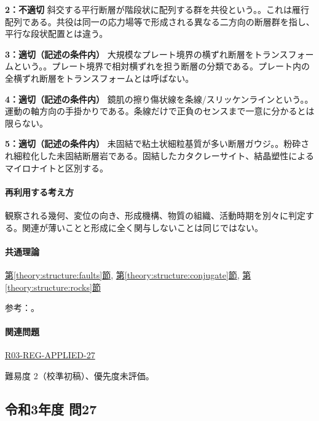 \noindent\textbf{2：不適切} 斜交する平行断層が階段状に配列する群を共役という。。これは雁行配列である。共役は同一の応力場等で形成される異なる二方向の断層群を指し、平行な段状配置とは違う。\par

\noindent\textbf{3：適切（記述の条件内）} 大規模なプレート境界の横ずれ断層をトランスフォームという。。プレート境界で相対横ずれを担う断層の分類である。プレート内の全横ずれ断層をトランスフォームとは呼ばない。\par

\noindent\textbf{4：適切（記述の条件内）} 鏡肌の擦り傷状線を条線/スリッケンラインという。。運動の軸方向の手掛かりである。条線だけで正負のセンスまで一意に分かるとは限らない。\par

\noindent\textbf{5：適切（記述の条件内）} 未固結で粘土状細粒基質が多い断層ガウジ。。粉砕され細粒化した未固結断層岩である。固結したカタクレーサイト、結晶塑性によるマイロナイトと区別する。\par

\paragraph{再利用する考え方} 観察される幾何、変位の向き、形成機構、物質の組織、活動時期を別々に判定する。関連が薄いことと形成に全く関与しないことは同じではない。

\paragraph{共通理論} \hyperref[theory:structure:faults]{第\ref*{theory:structure:faults}節}, \hyperref[theory:structure:conjugate]{第\ref*{theory:structure:conjugate}節}, \hyperref[theory:structure:rocks]{第\ref*{theory:structure:rocks}節}

\par 参考：\cite{str_faultrocks,str_shear}。

\paragraph{関連問題} \hyperref[q:r03-reg-applied-27]{R03-REG-APPLIED-27}

\par 難易度 2（校準初稿）、優先度未評価。

\subsection{令和3年度 問27}
\label{q:r03-reg-applied-27}

